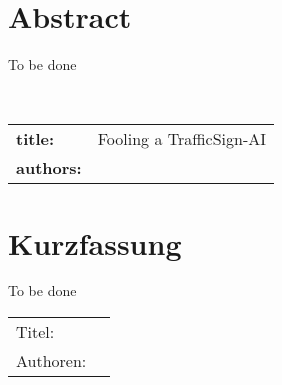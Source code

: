 \chapter*{Abstract} %
To be done

~\newline
~\newline
\begin{flushleft}
	\begin{tabular}{lp{11cm}}
		\textbf{title:} & Fooling a TrafficSign-AI \\
		\textbf{authors:}  & \autor \\
		
	\end{tabular} 
\end{flushleft}


\chapter*{Kurzfassung} 
To be done
~\newline
\begin{flushleft}
	\begin{tabular}{lp{11cm}}
		Titel:&  \titel \\ 
		Authoren:&  \autor \\
	\end{tabular} 
\end{flushleft}